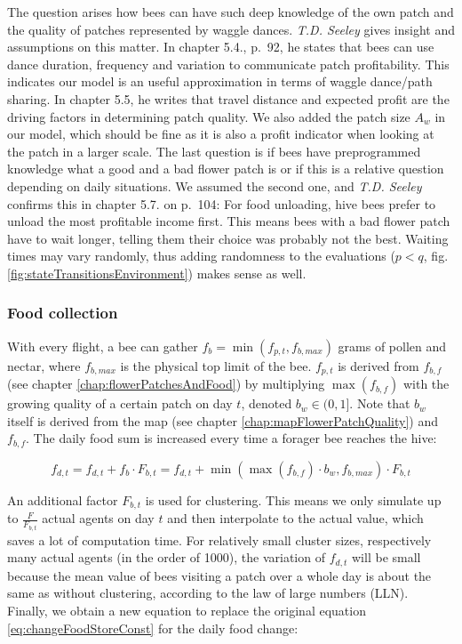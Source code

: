 			The question arises how bees can have such deep knowledge of the own patch and the quality of patches represented by waggle dances. \textit{T.D. Seeley} \cite{seeley95} gives insight and assumptions on this matter. In chapter 5.4., p.~92, he states that bees can use dance duration, frequency and variation to communicate patch profitability. This indicates our model is an useful approximation in terms of waggle dance/path sharing. In chapter 5.5, he writes that travel distance and expected profit are the driving factors in determining patch quality. We also added the patch size $A_w$ in our model, which should be fine as it is also a profit indicator when looking at the patch in a larger scale. The last question is if bees have preprogrammed knowledge what a good and a bad flower patch is or if this is a relative question depending on daily situations. We assumed the second one, and \textit{T.D. Seeley} confirms this in chapter 5.7. on p.~104: For food unloading, hive bees prefer to unload the most profitable income first. This means bees with a bad flower patch have to wait longer, telling them their choice was probably not the best. Waiting times may vary randomly, thus adding randomness to the evaluations ($p < q$, fig. \ref{fig:stateTransitionsEnvironment}) makes sense as well.
	
		\subsubsection{Food collection}
			\label{chap:foodCollection}
			With every flight, a bee can gather $f_b = \min(f_{p,t},f_{b,max})$ grams of pollen and nectar, where $f_{b,max}$ is the physical top limit of the bee. $f_{p,t}$ is derived from $f_{b,f}$ (see chapter \ref{chap:flowerPatchesAndFood}) by multiplying $\max(f_{b,f})$ with the growing quality of a certain patch on day $t$, denoted $b_w \in (0,1]$. Note that $b_w$ itself is derived from the map (see chapter \ref{chap:mapFlowerPatchQuality}) and $f_{b,f}$. The daily food sum is increased every time a forager bee reaches the hive:
			
			\begin{equation}\label{eq:foodChangeDailyComputation}
				f_{d,t} = f_{d,t} + f_b \cdot F_{b,t} = f_{d,t} + \min(\max(f_{b,f}) \cdot b_w,f_{b,max}) \cdot F_{b,t}
			\end{equation}
			
			An additional factor $F_{b,t}$ is used for clustering. This means we only simulate up to $\frac{F}{F_{b,t}}$ actual agents on day $t$ and then interpolate to the actual value, which saves a lot of computation time. For relatively small cluster sizes, respectively many actual agents (in the order of 1000), the variation of $f_{d,t}$ will be small because the mean value of bees visiting a patch over a whole day is about the same as without clustering, according to the law of large numbers (LLN).\\
			Finally, we obtain a new equation to replace the original equation \ref{eq:changeFoodStoreConst} for the daily food change:
			
